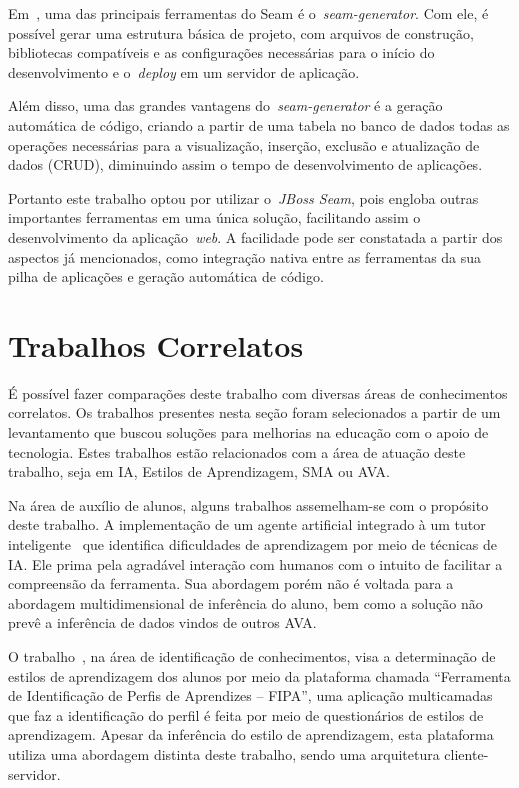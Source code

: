 Em~\cite{allen09}, uma das principais ferramentas do Seam é o~\emph{seam-generator}. Com ele, é possível gerar uma estrutura básica de projeto, com arquivos de construção, bibliotecas compatíveis e as configurações necessárias para o início do desenvolvimento e o~\emph{deploy} em um servidor de aplicação.

Além disso, uma das grandes vantagens do~\emph{seam-generator} é a geração automática de código, criando a partir de uma tabela no banco de dados todas as operações necessárias para a visualização, inserção, exclusão e atualização de dados (CRUD), diminuindo assim o tempo de desenvolvimento de aplicações.

Portanto este trabalho optou por utilizar o~\emph{JBoss Seam}, pois engloba outras importantes ferramentas em uma única solução, facilitando assim o desenvolvimento da aplicação~\emph{web}. A facilidade pode ser constatada a partir dos aspectos já mencionados, como integração nativa entre as ferramentas da sua pilha de aplicações e geração automática de código.

\section{Trabalhos Correlatos}\label{section:trabcorrelatos}
É possível fazer comparações deste trabalho com diversas áreas de conhecimentos correlatos. Os trabalhos presentes nesta seção foram selecionados a partir de um levantamento que buscou soluções para melhorias na educação com o apoio de tecnologia. Estes trabalhos estão relacionados com a área de atuação deste trabalho, seja em IA, Estilos de Aprendizagem, SMA ou AVA.

Na área de auxílio de alunos, alguns trabalhos assemelham-se com o propósito deste trabalho. A implementação de um agente artificial integrado à um tutor inteligente~\cite{soaresagente} que identifica dificuldades de aprendizagem por meio de técnicas de IA. Ele prima pela agradável interação com humanos com o intuito de facilitar a compreensão da ferramenta. Sua abordagem porém não é voltada para a abordagem multidimensional de inferência do aluno, bem como a solução não prevê a inferência de dados vindos de outros AVA.

O trabalho~\cite{bativa2011}, na área de identificação de conhecimentos, visa a determinação de estilos de aprendizagem dos alunos por meio da plataforma chamada ``Ferramenta de Identificação de Perfis de Aprendizes – FIPA'', uma aplicação multicamadas que faz a identificação do perfil é feita por meio de questionários de estilos de aprendizagem. Apesar da inferência do estilo de aprendizagem, esta plataforma utiliza uma abordagem distinta deste trabalho, sendo uma arquitetura cliente-servidor. 

